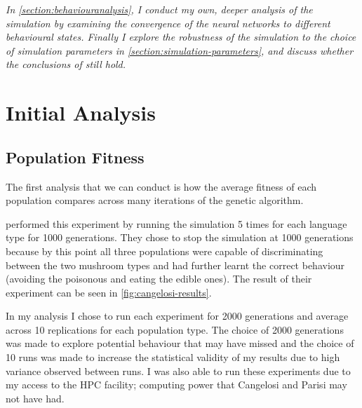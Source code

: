 \documentclass[12pt,a4paper]{report}
\begin{document}
\emph{In \cref{section:behaviouranalysis}, I conduct my own, deeper analysis of the simulation by examining the convergence of the neural networks to different behavioural states. Finally I explore the robustness of the simulation to the choice of simulation parameters in \cref{section:simulation-parameters}, and discuss whether the conclusions of \citet{Cangelosi1998} still hold.}

\section{Initial Analysis}\label{section:initialanalysis}

\subsection{Population Fitness}\label{section:popfit}
 
The first analysis that we can conduct is how the average fitness of each population compares across many iterations of the genetic algorithm.

\citet{Cangelosi1998} performed this experiment by running the simulation 5 times for each language type for 1000 generations. They chose to stop the simulation at 1000 generations because by this point all three populations were capable of discriminating between the two mushroom types and had further learnt the correct behaviour (avoiding the poisonous and eating the edible ones). The result of their experiment can be seen in \cref{fig:cangelosi-results}.

In my analysis I chose to run each experiment for 2000 generations and average across 10 replications for each population type. The choice of 2000 generations was made to explore potential behaviour that \citet{Cangelosi1998} may have missed and the choice of 10 runs was made to increase the statistical validity of my results due to high variance observed between runs. I was also able to run these experiments due to my access to the HPC facility; computing power that Cangelosi and Parisi may not have had. 
\end{document}

